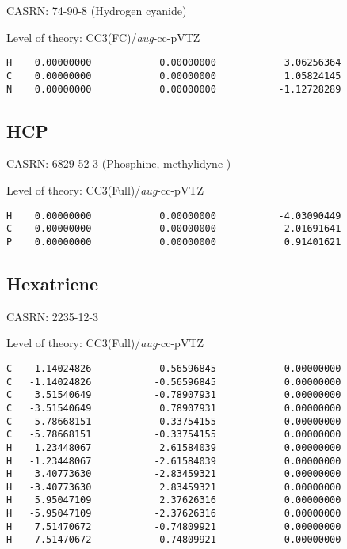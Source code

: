 \documentclass[journal=jctcce,manuscript=article,layout=traditional]{achemso}
\newcommand{\AVTZ}{\emph{aug}-cc-pVTZ}
\begin{document}
CASRN: 74-90-8 (Hydrogen cyanide)

\begin{singlespace}
\noindent  Level of theory: CC3(FC)/{\AVTZ}
\begin{verbatim}
H    0.00000000            0.00000000            3.06256364
C    0.00000000            0.00000000            1.05824145
N    0.00000000            0.00000000           -1.12728289
\end{verbatim}
\end{singlespace}

\subsection{HCP}

CASRN: 6829-52-3 (Phosphine, methylidyne-)

\begin{singlespace}
\noindent  Level of theory: CC3(Full)/{\AVTZ}
\begin{verbatim}
H    0.00000000            0.00000000           -4.03090449
C    0.00000000            0.00000000           -2.01691641
P    0.00000000            0.00000000            0.91401621
\end{verbatim}
\end{singlespace}

\subsection{Hexatriene}

CASRN: 2235-12-3

\begin{singlespace}
\noindent Level of theory: CC3(Full)/{\AVTZ}
\begin{verbatim}
C    1.14024826            0.56596845            0.00000000
C   -1.14024826           -0.56596845            0.00000000
C    3.51540649           -0.78907931            0.00000000
C   -3.51540649            0.78907931            0.00000000
C    5.78668151            0.33754155            0.00000000
C   -5.78668151           -0.33754155            0.00000000
H    1.23448067            2.61584039            0.00000000
H   -1.23448067           -2.61584039            0.00000000
H    3.40773630           -2.83459321            0.00000000
H   -3.40773630            2.83459321            0.00000000
H    5.95047109            2.37626316            0.00000000
H   -5.95047109           -2.37626316            0.00000000
H    7.51470672           -0.74809921            0.00000000
H   -7.51470672            0.74809921            0.00000000
\end{verbatim}
\end{singlespace}
\end{document}
